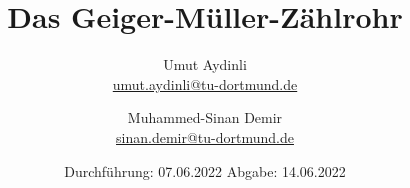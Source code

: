 

\subject{V703}
\title{Das Geiger-Müller-Zählrohr}
\author{Umut Aydinli \\
 \href{mailto:umut.aydinli@tu-dortmund.de}{umut.aydinli@tu-dortmund.de}
 \and Muhammed-Sinan Demir \\
 \href{mailto:sinan.demir@tu-dortmund.de}{sinan.demir@tu-dortmund.de}
 }
\date{
  Durchführung: 07.06.2022
  \hspace{3em}
  Abgabe: 14.06.2022
}




\maketitle
\tableofcontents
\newpage








\nocite{*}
\printbibliography{}

